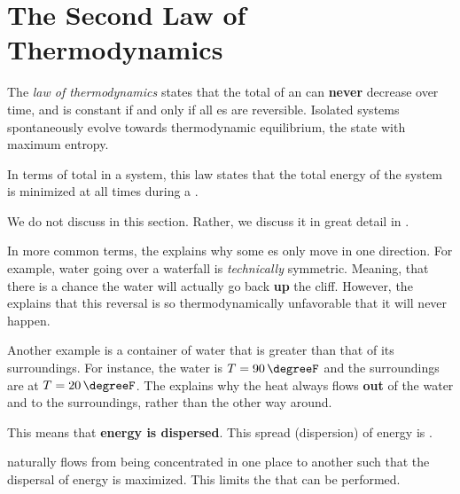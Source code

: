 \section{The Second Law of Thermodynamics}\label{sec:2nd_Law_Thermo}
\begin{definition}\label{def:2nd_Law_Thermo}
  The \emph{ law of thermodynamics} states that the total  of an  can \textbf{never} decrease over time, and is constant if and only if all es are reversible.
  Isolated systems spontaneously evolve towards thermodynamic equilibrium, the state with maximum entropy.

  In terms of total  in a system, this law states that the total energy of the system is minimized at all times during a .

  \begin{remark}
    We do not discuss  in this section.
    Rather, we discuss it in great detail in .
  \end{remark}
\end{definition}

In more common terms, the  explains why some es only move in one direction.
For example, water going over a waterfall is \textit{technically} symmetric.
Meaning, that there is a chance the water will actually go back \textbf{up} the cliff.
However, the  explains that this reversal is so thermodynamically unfavorable that it will never happen.

Another example is a container of water that is greater than that of its surroundings.
For instance, the water is $\Temp = \SI{90}{\degreeF}$ and the surroundings are at $\Temp = \SI{20}{\degreeF}$.
The  explains why the heat always flows \textbf{out} of the water and to the surroundings, rather than the other way around.

This means that \textbf{energy is dispersed}.
This spread (dispersion) of energy is .

\begin{blackbox}
   naturally flows from being concentrated in one place to another such that the dispersal of energy is maximized.
  This limits the  that can be performed.
\end{blackbox}

